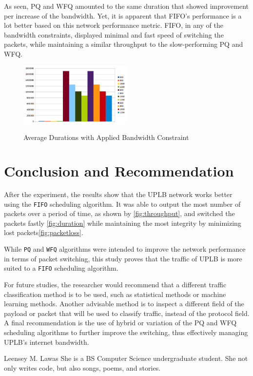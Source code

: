 \documentclass[journal]{IEEE/IEEEtran}
\newcommand{\ADVISEE}{Leensey M. Lawas}
\begin{document}
As seen, PQ and WFQ amounted to the same duration that showed improvement per increase of the bandwidth. Yet, it is apparent that FIFO's performance is a lot better based on this network performance metric. FIFO, in any of the bandwidth constraints, displayed minimal and fast speed of switching the packets, while maintaining a similar throughput to the slow-performing PQ and WFQ.

\begin{figure}
\includegraphics[width=0.5\textwidth]{duration_with_bc}
\label{fig:bc}\caption{Average Durations with Applied Bandwidth Constraint}
\end{figure}

\section{Conclusion and Recommendation}
After the experiment, the results show that the UPLB network works better using the \texttt{FIFO} scheduling algorithm. It was able to output the most number of packets over a period of time, as shown by \ref{fig:throughput}, and switched the packets fastly \ref{fig:duration} while maintaining the most integrity by minimizing lost packets\ref{fig:packetloss}.

While \texttt{PQ} and \texttt{WFQ} algorithms were intended to improve the network performance in terms of packet switching, this study proves that the traffic of UPLB is more suited to a \texttt{FIFO} scheduling algorithm.

For future studies, the researcher would recommend that a different traffic classification method is to be used, such as statistical methods or machine learning methods. Another advisable method is to inspect a different field of the payload or packet that will be used to classify traffic, instead of the protocol field. A final recommendation is the use of hybrid or variation of the PQ and WFQ scheduling algorithms to further improve the switching, thus effectively managing UPLB's internet bandwidth.




\begin{biography}{\ADVISEE}
She is a BS Computer Science undergraduate student. She not only writes code, but also songs, poems, and stories.
\end{biography}
\end{document}
